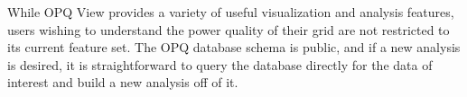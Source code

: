 While OPQ View provides a variety of useful visualization and analysis features, users wishing to understand the power quality of their grid are not restricted to its current feature set. The OPQ database schema is public, and if a new analysis is desired, it is straightforward to query the database directly for the data of interest and build a new analysis off of it.


















